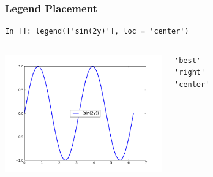 \documentclass[14pt,compress]{beamer}
\newcommand{\emphbar}[1]
{\begin{beamercolorbox}[rounded=true]{emphbar} 
      {#1}
 \end{beamercolorbox}
}
\newcounter{time}
\newcommand{\inctime}[1]{\addtocounter{time}{#1}{\tiny \thetime\ m}}
\begin{document}
\begin{frame}[fragile]
\frametitle{Legend Placement}
\begin{block}{}
    \small
\begin{lstlisting}
In []: legend(['sin(2y)'], loc = 'center')
\end{lstlisting}
\end{block}

\begin{columns}
 \includegraphics[height=2in, interpolate=true]{data/position}  
\vspace{-0.2in}
\begin{lstlisting}
'best' 
'right'
'center'
\end{lstlisting}
\end{columns}
\end{frame}

\end{document}
